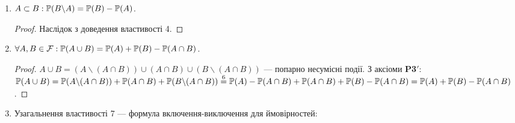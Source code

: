 \begin{enumerate}
\begin{proof}
    \end{proof}
    \item $A \subset B: \P(B \backslash A) = \P(B) - \P(A)$.
    \begin{proof}
        Наслідок з доведення властивості 4.
    \end{proof}
    \item $\forall A, B \in \mathcal{F}: \P(A \cup B) = \P(A) + \P(B) - \P(A \cap B)$.
    \begin{proof}
        $A \cup B = (A\backslash(A \cap B)) 
        \cup (A \cap B) 
        \cup (B\backslash(A \cap B))$ --- попарно несумісні події. 
        \newline
        З аксіоми \textbf{P3$'$}: $\P(A \cup B) = \P(A\backslash(A \cap B)) 
        + \P(A \cap B) + \P(B\backslash(A \cap B)) \overset{6}{=} \P(A) - \P(A \cap B) + \P(A \cap B)
        + \P(B) - \P(A \cap B) = \P(A) + \P(B) - \P(A \cap B)$.
    \end{proof}
    \item Узагальнення властивості 7 --- формула включення-виключення для ймовірностей: 
    

\end{enumerate}
